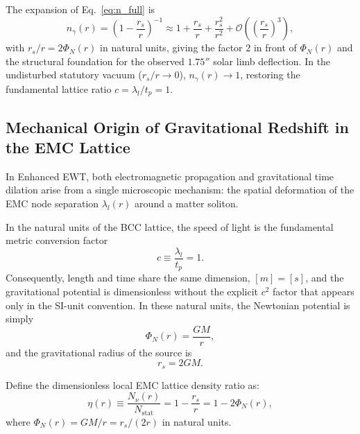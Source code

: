 \documentclass[10pt,a4paper]{article}
\begin{document}
The expansion of Eq.~\eqref{eq:n_full} is
\begin{equation}
	n_\gamma(r) = \left(1 - \frac{r_s}{r}\right)^{-1}
	\approx 1 + \frac{r_s}{r} + \frac{r_s^2}{r^2}
	+ \mathcal{O}\!\left(\left(\frac{r_s}{r}\right)^3\right),
	\label{eq:n_full_expansion}
\end{equation}
with $r_s/r = 2\Phi_N(r)$ in natural units, giving the factor $2$ in
front of $\Phi_N(r)$ and the structural foundation for the observed
$1.75''$ solar limb deflection. In the undisturbed statutory vacuum
($r_s/r \to 0$), $n_\gamma(r) \to 1$, restoring the fundamental lattice
ratio $c = \lambda_l/t_p = 1$.
%
%

\subsection{Mechanical Origin of Gravitational Redshift in the EMC Lattice}
\label{sec:grav_time_dilation_clock}

In Enhanced EWT, both electromagnetic propagation and gravitational
time dilation arise from a single microscopic mechanism: the spatial
deformation of the EMC node separation $\lambda_l(r)$ around a matter
soliton.

In the natural units of the BCC lattice, the speed of light is the
fundamental metric conversion factor
\[
c \equiv \frac{\lambda_l}{t_p} = 1 .
\]
Consequently, length and time share the same dimension,
\([m]=[s]\), and the gravitational potential is dimensionless
without the explicit \(c^{2}\) factor that appears only in the
SI-unit convention. In these natural units, the Newtonian potential
is simply
\begin{equation}
	\Phi_N(r) = \frac{GM}{r},
\end{equation}
and the gravitational radius of the source is
\begin{equation}
	r_s = 2GM .
\end{equation}

Define the dimensionless local EMC lattice density ratio as:
\begin{equation}
	\eta(r) \equiv \frac{N_\nu(r)}{N_{\text{stat}}}
	= 1 - \frac{r_s}{r}
	= 1 - 2\Phi_N(r),
	\label{eq:emc_density_ratio}
\end{equation}
where \(\Phi_N(r) = GM/r = r_s/(2r)\) in natural units.
\end{document}
